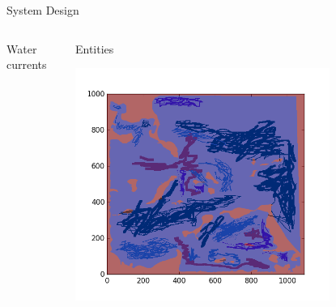 \documentclass[9pt]{beamer}
\begin{document}
\begin{frame}{System Design}
\begin{columns}
\begin{column}{0.33\textwidth}
\begin{block}{Water currents}
\begin{center}
                 \end{center}
             \end{block} 
        \end{column}
         \begin{column}{0.33\textwidth}
             \begin{block}{Entities}   
                 \begin{center}
                     \includegraphics[width=0.75\textwidth,trim={2cm 2cm 1.75cm 1cm},clip]{img/Fig_entitiesMap.png}
                 \end{center}
             \end{block} 
        \end{column}
    \end{columns}
\end{frame}
\end{document}
